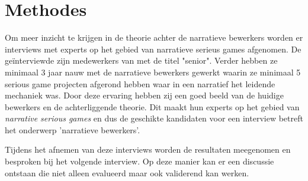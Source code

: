 \chapter{Methodes}


Om meer inzicht te krijgen in de theorie achter de narratieve bewerkers worden er interviews met experts op het gebied van narratieve serieus games afgenomen. De geïnterviewde zijn medewerkers van \organisation{} met de titel "senior". Verder hebben ze minimaal 3 jaar nauw met de narratieve bewerkers gewerkt waarin ze minimaal 5 serious game projecten afgerond hebben waar in een narratief het leidende mechaniek was. Door deze ervaring hebben zij een goed beeld van de huidige bewerkers en de achterliggende theorie. Dit maakt hun experts op het gebied van \emph{narrative serious games} en dus de geschikte kandidaten voor een interview betreft het onderwerp 'narratieve bewerkers'. %

Tijdens het afnemen van deze interviews worden de resultaten meegenomen en besproken bij het volgende interview. Op deze manier kan er een discussie ontstaan die niet alleen evalueerd maar ook validerend kan werken.


